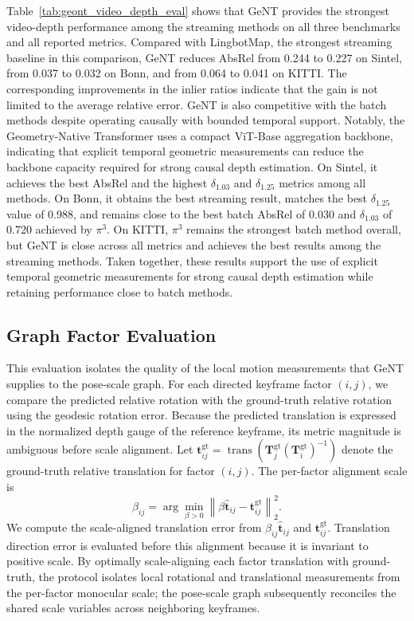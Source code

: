 Table~\ref{tab:geont_video_depth_eval} shows that GeNT provides the strongest video-depth performance among the streaming methods on all three benchmarks and all reported metrics.
Compared with LingbotMap, the strongest streaming baseline in this comparison, GeNT reduces AbsRel from 0.244 to 0.227 on Sintel, from 0.037 to 0.032 on Bonn, and from 0.064 to 0.041 on KITTI.
The corresponding improvements in the inlier ratios indicate that the gain is not limited to the average relative error.
GeNT is also competitive with the batch methods despite operating causally with bounded temporal support.
Notably, the Geometry-Native Transformer uses a compact ViT-Base aggregation backbone, indicating that explicit temporal geometric measurements can reduce the backbone capacity required for strong causal depth estimation.
On Sintel, it achieves the best AbsRel and the highest $\delta_{1.03}$ and $\delta_{1.25}$ metrics among all methods.
On Bonn, it obtains the best streaming result, matches the best $\delta_{1.25}$ value of 0.988, and remains close to the best batch AbsRel of 0.030 and $\delta_{1.03}$ of 0.720 achieved by $\pi^{3}$.
On KITTI, $\pi^{3}$ remains the strongest batch method overall, but GeNT is close across all metrics and achieves the best results among the streaming methods.
Taken together, these results support the use of explicit temporal geometric measurements for strong causal depth estimation while retaining performance close to batch methods.

\subsection{Graph Factor Evaluation}
This evaluation isolates the quality of the local motion measurements that GeNT supplies to the pose-scale graph.
For each directed keyframe factor $(i,j)$, we compare the predicted relative rotation with the ground-truth relative rotation using the geodesic rotation error.
Because the predicted translation is expressed in the normalized depth gauge of the reference keyframe, its metric magnitude is ambiguous before scale alignment.
Let $\bm{t}^{\mathrm{gt}}_{ij}=\operatorname{trans}(\bm{T}^{\mathrm{gt}}_j(\bm{T}^{\mathrm{gt}}_i)^{-1})$ denote the ground-truth relative translation for factor $(i,j)$.
The per-factor alignment scale is
\begin{equation}
    \beta_{ij}
    =
    \arg\min_{\beta>0}
    \left\|
        \beta \hat{\bm{t}}_{ij} - \bm{t}^{\mathrm{gt}}_{ij}
    \right\|_2^2 .
    \label{eq:geont_factor_scale_alignment}
\end{equation}
We compute the scale-aligned translation error from $\beta_{ij}\hat{\bm{t}}_{ij}$ and $\bm{t}^{\mathrm{gt}}_{ij}$.
Translation direction error is evaluated before this alignment because it is invariant to positive scale.
By optimally scale-aligning each factor translation with ground-truth, the protocol isolates local rotational and translational measurements from the per-factor monocular scale; the pose-scale graph subsequently reconciles the shared scale variables across neighboring keyframes.

